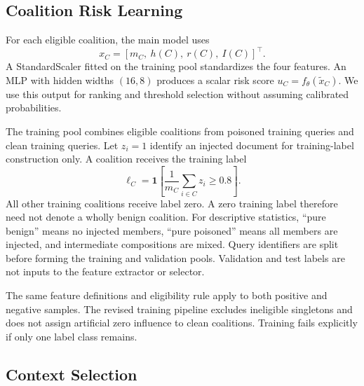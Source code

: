 \documentclass[sigconf]{acmart}
\newif\ifrevisionnotes
\newcommand{\verification}[1]{%
  \ifrevisionnotes
    \par\smallskip\noindent
    {\small\color{red!65!black}\textbf{Verification pending.} #1}\par\smallskip
  \fi}
\begin{document}
\subsection{Coalition Risk Learning}
\label{sec:risk}

For each eligible coalition, the main model uses
\begin{equation}
 x_C=[m_C,\ h(C),\ r(C),\ I(C)]^\top.
 \label{eq:features}
\end{equation}
A StandardScaler fitted on the training pool standardizes the four features. An MLP with hidden widths $(16,8)$ produces a scalar risk score $u_C=f_\theta(\widetilde{x}_C)$. We use this output for ranking and threshold selection without assuming calibrated probabilities.

The training pool combines eligible coalitions from poisoned training queries and clean training queries. Let $z_i=1$ identify an injected document for training-label construction only. A coalition receives the training label
\begin{equation}
 \ell_C=\mathbf{1}\!\left[\frac{1}{m_C}\sum_{i\in C}z_i\geq 0.8\right].
 \label{eq:label}
\end{equation}
All other training coalitions receive label zero. A zero training label therefore need not denote a wholly benign coalition. For descriptive statistics, ``pure benign'' means no injected members, ``pure poisoned'' means all members are injected, and intermediate compositions are mixed. Query identifiers are split before forming the training and validation pools. Validation and test labels are not inputs to the feature extractor or selector.

The same feature definitions and eligibility rule apply to both positive and negative samples. The revised training pipeline excludes ineligible singletons and does not assign artificial zero influence to clean coalitions. Training fails explicitly if only one label class remains.

\verification{Record the optimizer, activation, regularization, stopping tolerance, and any weighting or resampling from the saved MLP metadata. The available reports establish hidden widths, standardization, the label rule, and a 500-iteration cap, but not all optimizer settings.}

\subsection{Context Selection}
\label{sec:selection}
\end{document}
